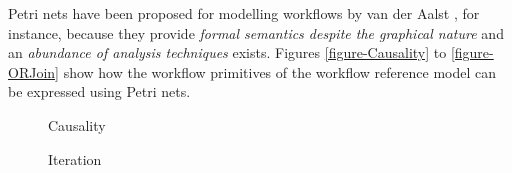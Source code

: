 Petri nets have been proposed for modelling workflows by van der Aalst
\cite{WA96}, for instance, because they provide \emph{formal semantics
despite the graphical nature} and an \emph{abundance of analysis
techniques} exists. Figures \ref{figure-Causality} to \ref{figure-ORJoin}
show how the workflow primitives of the workflow reference model
\cite{WfMC95} can be expressed using Petri nets.

\begin{figure}[htb]
  \begin{minipage}{0.45\textwidth}
    \begin{center}
      \caption[The \emph{Causality} workflow primitive]{Causality}
      \label{figure-Causality}
    \end{center}
  \end{minipage}
  \hfill
  \begin{minipage}{0.45\textwidth}
    \begin{center}
      \caption[The \emph{Iteration} workflow primitive]{Iteration}
      \label{figure-Iteration}
    \end{center}
  \end{minipage}
\end{figure}

